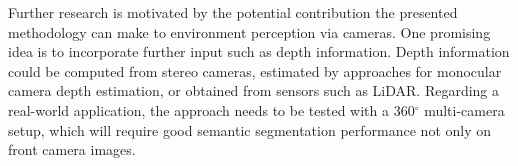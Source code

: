 \documentclass[a4paper, 10pt, conference]{ieeeconf}
\begin{document}
Further research is motivated by the potential contribution the presented methodology can make to environment perception via cameras. One promising idea is to incorporate further input such as depth information. Depth information could be computed from stereo cameras, estimated by approaches for monocular camera depth estimation, or obtained from sensors such as LiDAR. Regarding a real-world application, the approach needs to be tested with a 360\(^{\circ}\) multi-camera setup, which will require good semantic segmentation performance not only on front camera images.






\end{document}
